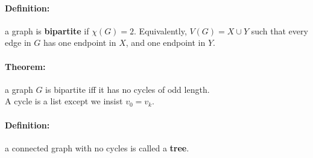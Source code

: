 \documentclass[a4paper, 11pt, twoside]{article}
\begin{document}
\paragraph{Definition:} a graph is \textbf{bipartite} if $\chi(G)=2$. Equivalently, $V(G)=X\cup Y$ such that every edge in $G$ has one endpoint in $X$, and one endpoint in $Y$.

\paragraph{Theorem:} a graph $G$ is bipartite iff it has no cycles of odd length.\\

A cycle is a list except we insist $v_0=v_k$.\\

\paragraph{Definition:} a connected graph with no cycles is called a \textbf{tree}.
\end{document}
